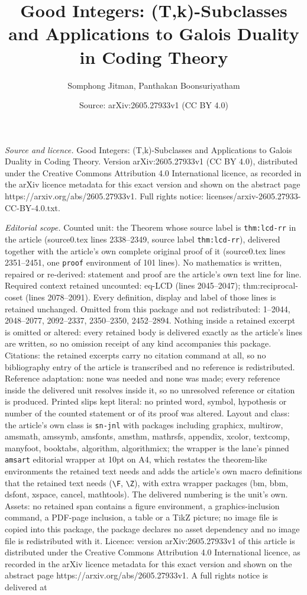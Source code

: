 \documentclass[10pt,a4paper]{amsart}
\title[Good Integers: (T,k)-Subclasses and Applications to Galois D]{Good Integers: (T,k)-Subclasses and Applications to Galois Duality in Coding Theory}
\author{Somphong Jitman, Panthakan Boonsuriyatham}
\date{Source: arXiv:2605.27933v1 (CC BY 4.0)}
\begin{document}
\maketitle

\noindent\emph{Source and licence.} Good Integers: (T,k)-Subclasses and Applications to Galois Duality in Coding Theory. Version arXiv:2605.27933v1 (CC BY 4.0), distributed under the Creative Commons Attribution 4.0 International licence, as recorded in the arXiv licence metadata for this exact version and shown on the abstract page https://arxiv.org/abs/2605.27933v1. Full rights notice: licenses/arxiv-2605.27933-CC-BY-4.0.txt.\par\smallskip

\noindent\textit{Editorial scope.} Counted unit: the Theorem whose source label is \texttt{thm:lcd-rr} in the article (source0.tex lines 2338--2349, source label \texttt{thm:lcd-rr}), delivered together with the article's own complete original proof of it (source0.tex lines 2351--2451, one \texttt{proof} environment of 101 lines). No mathematics is written, repaired or re-derived: statement and proof are the article's own text line for line. Required context retained uncounted: eq-LCD (lines 2045--2047); thm:reciprocal-coset (lines 2078--2091). Every definition, display and label of those lines is retained unchanged. Omitted from this package and not redistributed: 1--2044, 2048--2077, 2092--2337, 2350--2350, 2452--2894. Nothing inside a retained excerpt is omitted or altered: every retained body is delivered exactly as the article's lines are written, so no omission receipt of any kind accompanies this package. Citations: the retained excerpts carry no citation command at all, so no bibliography entry of the article is transcribed and no reference is redistributed. Reference adaptation: none was needed and none was made; every reference inside the delivered unit resolves inside it, so no unresolved reference or citation is produced. Printed slips kept literal: no printed word, symbol, hypothesis or number of the counted statement or of its proof was altered. Layout and class: the article's own class is \texttt{sn-jnl} with packages including graphicx, multirow, amsmath, amssymb, amsfonts, amsthm, mathrsfs, appendix, xcolor, textcomp, manyfoot, booktabs, algorithm, algorithmicx; the wrapper is the lane's pinned \texttt{amsart} editorial wrapper at 10pt on A4, which restates the theorem-like environments the retained text needs and adds the article's own macro definitions that the retained text needs (\texttt{\textbackslash F}, \texttt{\textbackslash Z}), with extra wrapper packages (bm, bbm, dsfont, xspace, cancel, mathtools). The delivered numbering is the unit's own. Assets: no retained span contains a figure environment, a graphics-inclusion command, a PDF-page inclusion, a table or a TikZ picture; no image file is copied into this package, the package declares no asset dependency and no image file is redistributed with it. Licence: version arXiv:2605.27933v1 of this article is distributed under the Creative Commons Attribution 4.0 International licence, as recorded in the arXiv licence metadata for this exact version and shown on the abstract page https://arxiv.org/abs/2605.27933v1. A full rights notice is delivered at 
\end{document}
